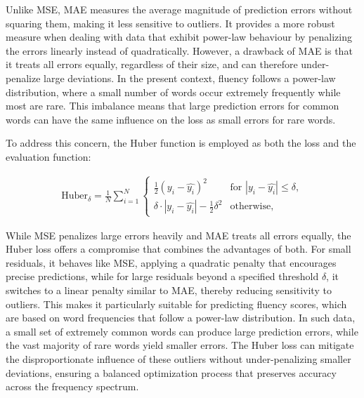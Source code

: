\documentclass[a4paper,11pt]{report}
\begin{document}
\noindent Unlike MSE, MAE measures the average magnitude of prediction errors without squaring them, making it less sensitive to outliers. It provides a more robust measure when dealing with data that exhibit power-law behaviour by penalizing the errors linearly instead of quadratically. However, a drawback of MAE is that it treats all errors equally, regardless of their size, and can therefore under-penalize large deviations. In the present context, fluency follows a power-law distribution, where a small number of words occur extremely frequently while most are rare. This imbalance means that large prediction errors for common words can have the same influence on the loss as small errors for rare words.

To address this concern, the Huber function is employed as both the loss and the evaluation function:

\begin{align}
    \text{Huber}_{\delta} = \frac{1}{N} \sum_{i=1}^N 
    \begin{cases}
        \frac{1}{2}(y_i - \hat{y_i})^2 & \text{for } |y_i - \hat{y_i}| \leq \delta, \\
        \delta \cdot |y_i - \hat{y_i}| - \frac{1}{2} \delta^2 & \text{otherwise},
    \end{cases}
\end{align}

\noindent While MSE penalizes large errors heavily and MAE treats all errors equally, the Huber loss offers a compromise that combines the advantages of both. For small residuals, it behaves like MSE, applying a quadratic penalty that encourages precise predictions, while for large residuals beyond a specified threshold $\delta$, it switches to a linear penalty similar to MAE, thereby reducing sensitivity to outliers. This makes it particularly suitable for predicting fluency scores, which are based on word frequencies that follow a power-law distribution. In such data, a small set of extremely common words can produce large prediction errors, while the vast majority of rare words yield smaller errors. The Huber loss can mitigate the disproportionate influence of these outliers without under-penalizing smaller deviations, ensuring a balanced optimization process that preserves accuracy across the frequency spectrum.
\end{document}
